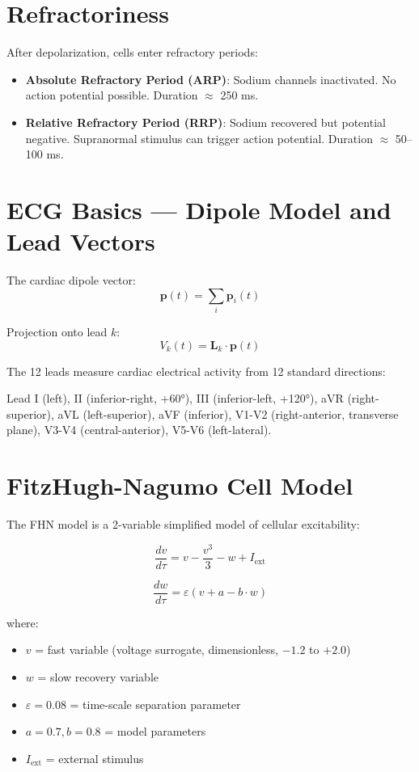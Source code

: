 \documentclass[12pt]{book}
\begin{document}
\section{Refractoriness}

After depolarization, cells enter refractory periods:

\begin{itemize}
  \item \textbf{Absolute Refractory Period (ARP)}: Sodium channels inactivated. No action potential possible. Duration $\approx$ 250 ms.
  
  \item \textbf{Relative Refractory Period (RRP)}: Sodium recovered but potential negative. Supranormal stimulus can trigger action potential. Duration $\approx$ 50--100 ms.
\end{itemize}

\section{ECG Basics — Dipole Model and Lead Vectors}

The cardiac dipole vector:
$$\mathbf{p}(t) = \sum_i \mathbf{p}_i(t)$$

Projection onto lead $k$:
$$V_k(t) = \mathbf{L}_k \cdot \mathbf{p}(t)$$

The 12 leads measure cardiac electrical activity from 12 standard directions:

Lead I (left), II (inferior-right, +60°), III (inferior-left, +120°), aVR (right-superior), aVL (left-superior), aVF (inferior), V1-V2 (right-anterior, transverse plane), V3-V4 (central-anterior), V5-V6 (left-lateral).

\section{FitzHugh-Nagumo Cell Model}

The FHN model is a 2-variable simplified model of cellular excitability:

\begin{equation}
\frac{dv}{d\tau} = v - \frac{v^3}{3} - w + I_{\text{ext}}
\end{equation}

\begin{equation}
\frac{dw}{d\tau} = \varepsilon (v + a - b \cdot w)
\end{equation}

where:
\begin{itemize}
  \item $v$ = fast variable (voltage surrogate, dimensionless, $-1.2$ to $+2.0$)
  \item $w$ = slow recovery variable
  \item $\varepsilon = 0.08$ = time-scale separation parameter
  \item $a = 0.7, b = 0.8$ = model parameters
  \item $I_{\text{ext}}$ = external stimulus
\end{itemize}
\end{document}
